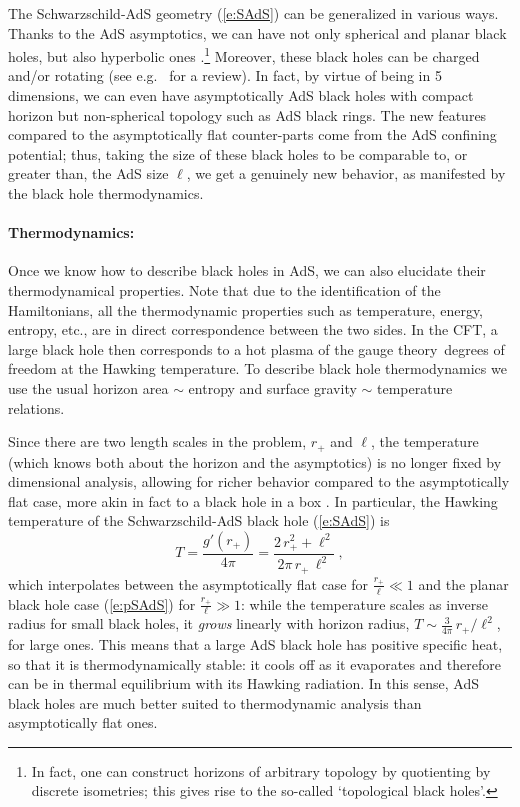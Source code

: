\documentclass[12pt]{article}
\def\req#1{(\ref{#1})}
\def\GT{gauge theory}
\def\schw{Schwarzschild}
\def\Rads{\ell}
\def\rh{r_+}
\begin{document}
The \schw-AdS geometry \req{e:SAdS} can be generalized in various ways.
Thanks to the AdS asymptotics, we can have not only spherical and planar black holes, but also hyperbolic ones \cite{Emparan:1999gf}.\footnote{
In fact, one can construct horizons of arbitrary topology by quotienting by discrete isometries; this gives rise to the so-called `topological black holes'.}
Moreover, these black holes can be charged and/or rotating (see e.g.\ \cite{Emparan:2008eg} for a review).  
In fact, by virtue of being in 5 dimensions, we can even have asymptotically AdS black holes with compact horizon but non-spherical topology such as AdS black rings.  The new features compared to the asymptotically flat counter-parts come from the AdS confining potential; thus, taking the size of these black holes to be comparable to, or greater than, the AdS size $\Rads$, we get a genuinely new behavior, as manifested by the black hole thermodynamics.

\paragraph{Thermodynamics:}  %
Once we know how to describe black holes in AdS, we can also elucidate their thermodynamical properties.   Note that due to the identification of the Hamiltonians, all the thermodynamic properties such as temperature, energy, entropy, etc., are in direct correspondence between the two sides.
In the CFT, a large black hole then corresponds to a hot plasma of the \GT\ degrees of freedom at the Hawking temperature. To describe black hole thermodynamics we use the usual horizon area $\sim$ entropy and surface gravity $\sim$ temperature relations.  

Since there are two length scales in the problem, $\rh$ and $\Rads$, 
the temperature (which knows both about the horizon and the asymptotics) is no longer fixed by dimensional analysis,  allowing for richer  behavior compared to the asymptotically flat case,  more akin in fact to a black hole in a box \cite{york1986black}.
In particular, the Hawking temperature of the \schw-AdS black hole \req{e:SAdS} is
%
\begin{equation}
T = \frac{g'(\rh)}{4  \pi}
= \frac{2\, r_+^2 + \Rads^2}{2 \pi\, r_+ \, \Rads^2} \ ,
\label{e:SAdST}
\end{equation}	
%
which interpolates between the asymptotically flat case for $\frac{\rh}{\Rads} \ll 1$ 
and the planar black hole case \req{e:pSAdS} for $\frac{\rh}{\Rads} \gg 1$: while  the temperature scales as inverse radius for small black holes, it {\it grows} linearly with horizon radius, 
$T \sim \frac{3}{4 \pi }\, \rh / \Rads^2$,  for large ones.
This means that a large AdS black hole has positive specific heat, so that it is thermodynamically stable: it cools off as it evaporates and therefore can be in thermal equilibrium with its Hawking radiation.  In this sense, AdS black holes are much better suited to thermodynamic analysis than  asymptotically flat ones.
\end{document}
